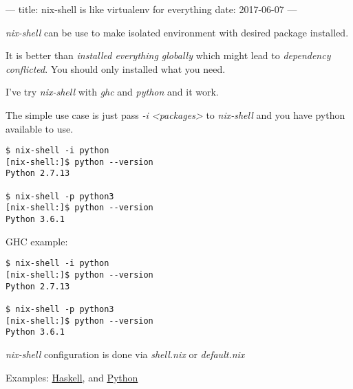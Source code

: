 ---
title: nix-shell is like virtualenv for everything
date: 2017-06-07
---


\textit{nix-shell} can be use to make isolated environment with desired package installed. 

It is better than \textit{installed everything globally} which might lead to \textit{dependency conflicted}.
You should only installed what you need.

I've try \textit{nix-shell} with \textit{ghc} and \textit{python} and it work.

The simple use case is just pass \textit{-i <packages>} to \textit{nix-shell} and you have python available to use.

\begin{verbatim}
$ nix-shell -i python
[nix-shell:]$ python --version
Python 2.7.13

$ nix-shell -p python3
[nix-shell:]$ python --version
Python 3.6.1
\end{verbatim}

GHC example:

\begin{verbatim}
$ nix-shell -i python
[nix-shell:]$ python --version
Python 2.7.13

$ nix-shell -p python3
[nix-shell:]$ python --version
Python 3.6.1
\end{verbatim}


\textit{nix-shell} configuration is done via \textit{shell.nix} or \textit{default.nix}

Examples: \href{../nix-vim-haskell}{Haskell}, and \href{../nix-vim-python}{Python}




